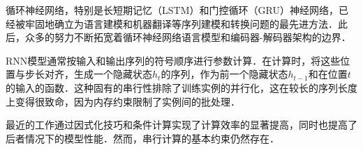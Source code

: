 
循环神经网络，特别是长短期记忆（LSTM）\citep{hochreiter1997}和门控循环（GRU）\citep{gruEval14}神经网络，已经被牢固地确立为语言建模和机器翻译等序列建模和转换问题的最先进方法\citep{sutskever14, bahdanau2014neural, cho2014learning}．此后，众多的努力不断拓宽着循环神经网络语言模型和编码器-解码器架构的边界\citep{wu2016google,luong2015effective,jozefowicz2016exploring}．


RNN模型通常按输入和输出序列的符号顺序进行参数计算．在计算时，将这些位置与步长对齐，生成一个隐藏状态$h_t$的序列，作为前一个隐藏状态$h_{t-1}$和在位置$t$的输入的函数．这种固有的串行性排除了训练实例的并行化，这在较长的序列长度上变得很致命，因为内存约束限制了实例间的批处理．


最近的工作通过因式化技巧\citep{Kuchaiev2017Factorization}和条件计算\citep{shazeer2017outrageously}实现了计算效率的显著提高，同时也提高了后者情况下的模型性能．然而，串行计算的基本约束仍然存在．


